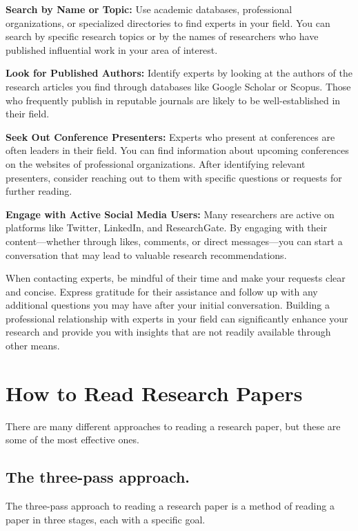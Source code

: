 \documentclass[
]{book}
\begin{document}
\textbf{Search by Name or Topic:} Use academic databases, professional organizations, or specialized directories to find experts in your field. You can search by specific research topics or by the names of researchers who have published influential work in your area of interest.

\textbf{Look for Published Authors:} Identify experts by looking at the authors of the research articles you find through databases like Google Scholar or Scopus. Those who frequently publish in reputable journals are likely to be well-established in their field.

\textbf{Seek Out Conference Presenters:} Experts who present at conferences are often leaders in their field. You can find information about upcoming conferences on the websites of professional organizations. After identifying relevant presenters, consider reaching out to them with specific questions or requests for further reading.

\textbf{Engage with Active Social Media Users:} Many researchers are active on platforms like Twitter, LinkedIn, and ResearchGate. By engaging with their content---whether through likes, comments, or direct messages---you can start a conversation that may lead to valuable research recommendations.

When contacting experts, be mindful of their time and make your requests clear and concise. Express gratitude for their assistance and follow up with any additional questions you may have after your initial conversation. Building a professional relationship with experts in your field can significantly enhance your research and provide you with insights that are not readily available through other means.

\section{How to Read Research Papers}\label{read}

There are many different approaches to reading a research paper, but these are some of the most effective ones.

\subsection*{The three-pass approach.}\label{the-three-pass-approach.}

The three-pass approach to reading a research paper is a method of reading a paper in three stages, each with a specific goal.
\end{document}

